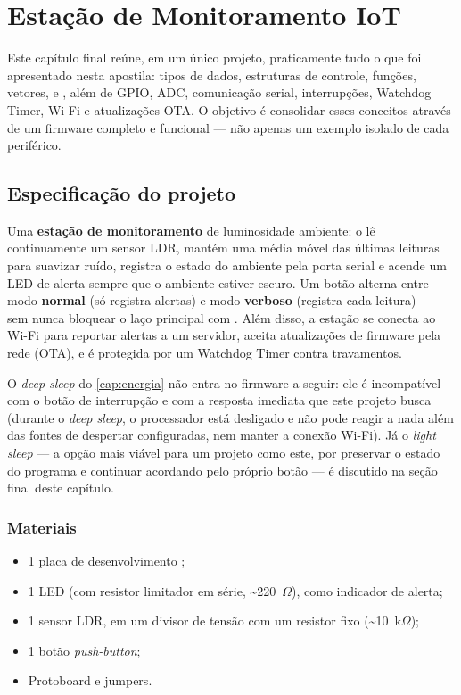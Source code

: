 \chapter{Estação de Monitoramento IoT}
\label{cap:projeto-final}

Este capítulo final reúne, em um único projeto, praticamente tudo o que foi apresentado nesta apostila: tipos de dados, estruturas de controle, funções, vetores,  e , além de GPIO, ADC, comunicação serial, interrupções, Watchdog Timer, Wi-Fi e atualizações OTA. O objetivo é consolidar esses conceitos através de um firmware completo e funcional — não apenas um exemplo isolado de cada periférico.

\section{Especificação do projeto}

Uma \textbf{estação de monitoramento} de luminosidade ambiente: o \ESP{} lê continuamente um sensor LDR, mantém uma média móvel das últimas leituras para suavizar ruído, registra o estado do ambiente pela porta serial e acende um LED de alerta sempre que o ambiente estiver escuro. Um botão alterna entre modo \textbf{normal} (só registra alertas) e modo \textbf{verboso} (registra cada leitura) — sem nunca bloquear o laço principal com . Além disso, a estação se conecta ao Wi-Fi para reportar alertas a um servidor, aceita atualizações de firmware pela rede (OTA), e é protegida por um Watchdog Timer contra travamentos.

\begin{nota}
O \emph{deep sleep} do \cref{cap:energia} não entra no firmware a seguir: ele é incompatível com o botão de interrupção e com a resposta imediata que este projeto busca (durante o \emph{deep sleep}, o processador está desligado e não pode reagir a nada além das fontes de despertar configuradas, nem manter a conexão Wi-Fi). Já o \emph{light sleep} — a opção mais viável para um projeto como este, por preservar o estado do programa e continuar acordando pelo próprio botão — é discutido na seção final deste capítulo.
\end{nota}

\subsection{Materiais}

\begin{itemize}
    \item 1 placa de desenvolvimento \ESP{};
    \item 1 LED (com resistor limitador em série, \textasciitilde220~$\Omega$), como indicador de alerta;
    \item 1 sensor LDR, em um divisor de tensão com um resistor fixo (\textasciitilde10~k$\Omega$);
    \item 1 botão \emph{push-button};
    \item Protoboard e jumpers.
\end{itemize}

